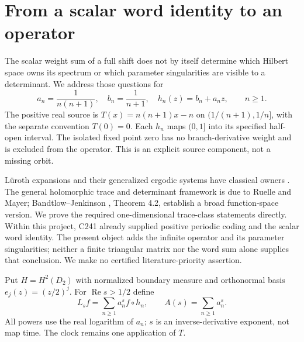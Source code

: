 \documentclass[10pt]{article}
\newcommand{\Ree}{\operatorname{Re}}
\begin{document}
\section{From a scalar word identity to an operator}
The scalar weight sum of a full shift does not by itself determine which
Hilbert space owns its spectrum or which parameter singularities are
visible to a determinant. We address those questions for
\[
 a_n=\frac1{n(n+1)},\quad b_n=\frac1{n+1},\quad
 h_n(z)=b_n+a_nz,\qquad n\ge1.
\]
The positive real source is
$T(x)=n(n+1)x-n$ on $(1/(n+1),1/n]$, with the separate convention $T(0)=0$.
Each $h_n$ maps $(0,1]$ into its specified half-open interval.
The isolated fixed point zero has no branch-derivative weight and is excluded
from the operator. This is an explicit source component, not a missing orbit.

Lüroth expansions and their generalized ergodic systems have classical
owners \cite{bbdk}. The general holomorphic trace and determinant framework
is due to Ruelle and Mayer; Bandtlow--Jenkinson \cite{bj}, Theorem 4.2,
establish a broad function-space version. We prove the required one-dimensional
trace-class statements directly. Within this project, C241 already supplied
positive periodic coding and the scalar word identity. The present object
adds the infinite operator and its parameter singularities; neither a
finite triangular matrix nor the word sum alone supplies that conclusion.
We make no certified literature-priority assertion.

Put $H=H^2(D_2)$ with normalized boundary measure and orthonormal basis
$e_j(z)=(z/2)^j$. For $\Ree s>1/2$ define
\begin{equation}\label{family}
 L_sf=\sum_{n\ge1}a_n^sf\circ h_n,\qquad A(s)=\sum_{n\ge1}a_n^s .
\end{equation}
All powers use the real logarithm of $a_n$; $s$ is an inverse-derivative
exponent, not map time. The clock remains one application of $T$.
\end{document}
